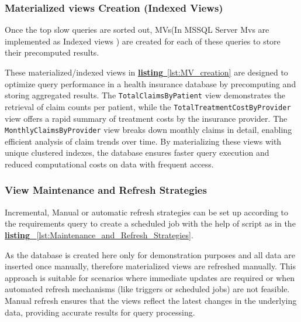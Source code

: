 \subsubsection{ Materialized views Creation (Indexed Views)}\label{Query_decomposition} Once the top slow queries are sorted out, MVs(In MSSQL Server Mvs are implemented as Indexed views ) are created for each of these queries to store their precomputed results.\vspace{.4cm}

  \vspace{.4cm} 



These materialized/indexed views in \hyperref[lst:MV_creation]{\textbf{listing}~\ref{lst:MV_creation}} are designed to optimize query performance in a health insurance database by precomputing and storing aggregated results. The \texttt{TotalClaimsByPatient} view demonstrates the retrieval of claim counts per patient, while the \texttt{TotalTreatmentCostByProvider} view offers a rapid summary of treatment costs by the insurance provider. The \texttt{MonthlyClaimsByProvider} view breaks down monthly claims in detail, enabling efficient analysis of claim trends over time. By materializing these views with unique clustered indexes, the database ensures faster query execution and reduced computational costs on data with frequent access.



  \subsubsection{View Maintenance and Refresh Strategies}\label{View_maintainance} Incremental, Manual or automatic refresh strategies can be set up according to the requirements query to create a scheduled job with the help of script as in the \hyperref[lst:Maintenance_and_Refresh_Strategies]{\textbf{listing} ~\ref{lst:Maintenance_and_Refresh_Strategies}}.\vspace{.4cm}

\vspace{.4cm}

As the database is created here only for demonstration purposes and all data are inserted once manually, therefore materialized views are refreshed manually. This approach is suitable for scenarios where immediate updates are required or when automated refresh mechanisms (like triggers or scheduled jobs) are not feasible. Manual refresh ensures that the views reflect the latest changes in the underlying data, providing accurate results for query processing.\vspace{.4cm}

